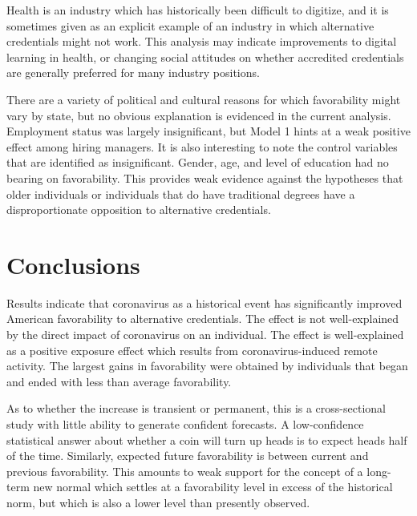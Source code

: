 \documentclass[review]{elsarticle}
\begin{document}
Health is an industry which has historically been difficult to digitize,
and it is sometimes given as an explicit example of an industry in which alternative credentials
might not work. %
This analysis may indicate improvements to digital learning in health,
or changing social attitudes on whether accredited credentials are
generally preferred for many industry positions.

There are a variety of political and cultural reasons for which favorability might vary by state,
but no obvious explanation is evidenced in the current analysis.
Employment status was largely insignificant,
but Model 1 hints at a weak positive effect among hiring managers.
It is also interesting to note the control variables that are identified as insignificant.
Gender, age, and level of education had no bearing on favorability.
This provides weak evidence against the hypotheses that older individuals
or individuals that do have traditional degrees have a disproportionate opposition to alternative credentials.

\section{Conclusions}

Results indicate that coronavirus as a historical event has significantly improved American favorability to alternative credentials.
The effect is not well-explained by the direct impact of coronavirus on an individual.
The effect is well-explained as a positive exposure effect which results from coronavirus-induced remote activity.
The largest gains in favorability were obtained by individuals that began and ended with less than average favorability.

As to whether the increase is transient or permanent, this is a cross-sectional study with little ability to generate confident forecasts.
A low-confidence statistical answer about whether a coin will turn up heads is to expect heads half of the time.
Similarly, expected future favorability is between current and previous favorability.
This amounts to weak support for the concept of a long-term new normal which settles at a favorability level in excess of the historical norm,
but which is also a lower level than presently observed.
\end{document}
